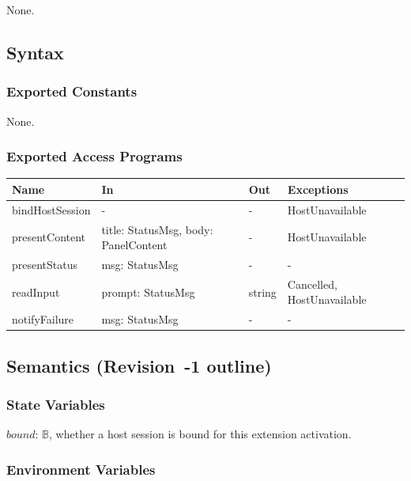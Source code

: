 \documentclass[12pt, titlepage]{article}
\begin{document}
None.

\subsection{Syntax}

\subsubsection{Exported Constants}

None.

\subsubsection{Exported Access Programs}

\begin{center}
\small
\begin{tabular}{>{\raggedright\arraybackslash}p{3.7cm} >{\raggedright\arraybackslash}p{3.8cm} >{\raggedright\arraybackslash}p{3.6cm} >{\raggedright\arraybackslash}p{3.7cm}}
\hline
\textbf{Name} & \textbf{In} & \textbf{Out} & \textbf{Exceptions} \\
\hline
bindHostSession & - & - & HostUnavailable \\
presentContent & title: StatusMsg, body: PanelContent & - & HostUnavailable \\
presentStatus & msg: StatusMsg & - & - \\
readInput & prompt: StatusMsg & string & Cancelled, HostUnavailable \\
notifyFailure & msg: StatusMsg & - & - \\
\hline
\end{tabular}
\end{center}

\subsection{Semantics (Revision~-1 outline)}

\subsubsection{State Variables}

$bound$: $\mathbb{B}$, whether a host session is bound for this extension activation.

\subsubsection{Environment Variables}
\end{document}
